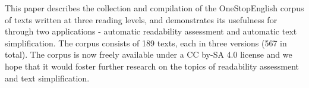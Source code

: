 This paper describes the collection and compilation of the OneStopEnglish corpus of texts written at three reading levels, and demonstrates its usefulness for through two applications - automatic readability assessment and automatic text simplification. The corpus consists of 189 texts, each in three versions (567 in total). The corpus is now freely available under a CC by-SA 4.0 license and we hope that it would foster further research on the topics of readability assessment and text simplification.
